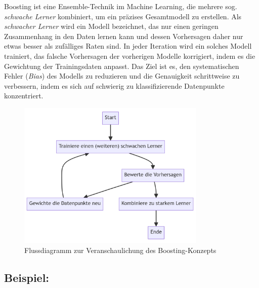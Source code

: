 Boosting ist eine Ensemble-Technik im Machine Learning, die mehrere sog. \emph{\glqq schwache Lerner\grqq} kombiniert,
um ein präzises Gesamtmodell zu erstellen. Als \emph{schwacher Lerner} wird ein Modell bezeichnet, das nur einen geringen
Zusammenhang in den Daten lernen kann und dessen Vorhersagen daher nur etwas besser als zufälliges Raten sind.
In jeder Iteration wird ein solches Modell trainiert, das falsche
Vorhersagen der vorherigen Modelle korrigiert, indem es die Gewichtung der Trainingsdaten anpasst.
Das Ziel ist es, den systematischen Fehler (\emph{Bias}) des Modells zu reduzieren und die Genauigkeit
schrittweise zu verbessern, indem es sich auf schwierig zu klassifizierende Datenpunkte konzentriert.

\begin{figure}[h]
    \centering
    \includegraphics[width=0.8\textwidth]{"./figures/Boosting_Graph"}
    \caption{Flussdiagramm zur Veranschaulichung des Boosting-Konzepts}
\end{figure}

\subsection*{Beispiel:}
